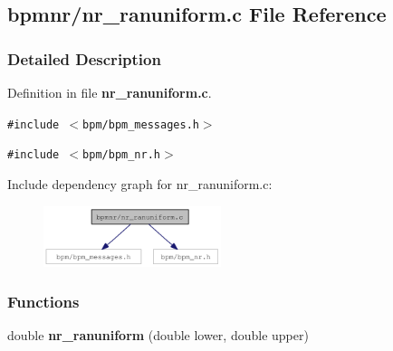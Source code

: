 \subsection{bpmnr/nr\_\-ranuniform.c File Reference}
\label{nr__ranuniform_8c}


\subsubsection{Detailed Description}


Definition in file {\bf nr\_\-ranuniform.c}.

{\tt \#include $<$bpm/bpm\_\-messages.h$>$}\par
{\tt \#include $<$bpm/bpm\_\-nr.h$>$}\par


Include dependency graph for nr\_\-ranuniform.c:\nopagebreak
\begin{figure}[H]
\begin{center}
\leavevmode
\includegraphics[width=147pt]{nr__ranuniform_8c__incl}
\end{center}
\end{figure}
\subsubsection*{Functions}
\begin{CompactItemize}
\item 
double {\bf nr\_\-ranuniform} (double lower, double upper)
\end{CompactItemize}
